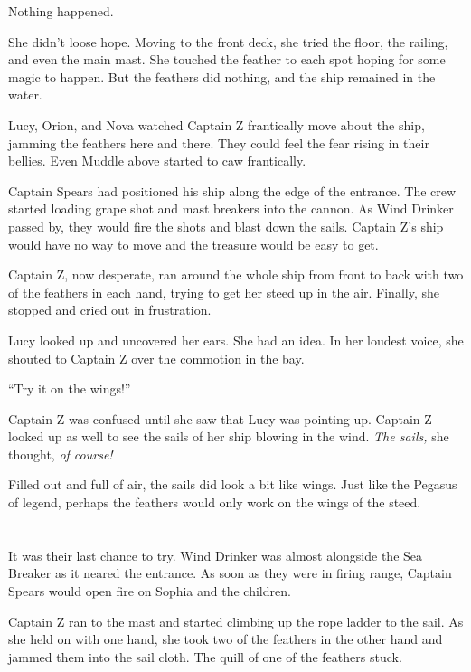 \documentclass[12pt]{extbook}
\begin{document}
  Nothing happened.
  
  She didn't loose hope. Moving to the front deck, she tried the floor,
  the railing, and even the main mast. She touched the feather to each
  spot hoping for some magic to happen. But the feathers did nothing, and
  the ship remained in the water.
  
  Lucy, Orion, and Nova watched Captain Z frantically move about the ship,
  jamming the feathers here and there. They could feel the fear rising in
  their bellies. Even Muddle above started to caw frantically.
  
  Captain Spears had positioned his ship along the edge of the entrance.
  The crew started loading grape shot and mast breakers into the cannon.
  As Wind Drinker passed by, they would fire the shots and blast down the
  sails. Captain Z's ship would have no way to move and the treasure would
  be easy to get.
  
  Captain Z, now desperate, ran around the whole ship from front to back
  with two of the feathers in each hand, trying to get her steed up in the
  air. Finally, she stopped and cried out in frustration.
  
  Lucy looked up and uncovered her ears. She had an idea. In her loudest
  voice, she shouted to Captain Z over the commotion in the bay.
  
  \enquote{Try it on the wings!}
  
  Captain Z was confused until she saw that Lucy was pointing up. Captain
  Z looked up as well to see the sails of her ship blowing in the wind.
  \emph{The sails,} she thought, \emph{of course!}
  
  Filled out and full of air, the sails did look a bit like wings. Just
  like the Pegasus of legend, perhaps the feathers would only work on the
  wings of the steed.
  
  \section{}\label{section-38}
  
  It was their last chance to try. Wind Drinker was almost alongside the
  Sea Breaker as it neared the entrance. As soon as they were in firing
  range, Captain Spears would open fire on Sophia and the children.
  
  Captain Z ran to the mast and started climbing up the rope ladder to the
  sail. As she held on with one hand, she took two of the feathers in the
  other hand and jammed them into the sail cloth. The quill of one of the
  feathers stuck.
  
\end{document}
